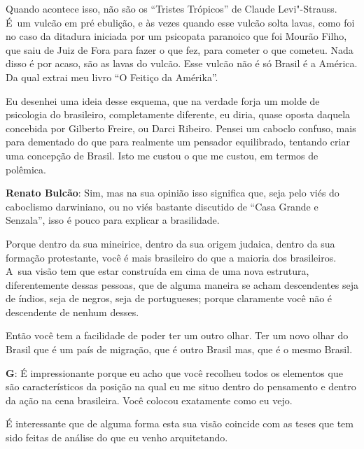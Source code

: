  

Quando acontece isso, não são os ``Tristes Trópicos'' de Claude
Levi"-Strauss. É~um vulcão em pré ebulição, e às vezes quando esse vulcão
solta lavas, como foi no caso da ditadura iniciada por um psicopata
paranoico que foi Mourão Filho, que saiu de Juiz de Fora para fazer o
que fez, para cometer o que cometeu. Nada disso é por acaso, são as
lavas do vulcão. Esse vulcão não é só Brasil é a América. Da qual extrai
meu livro ``O Feitiço da Amérika''.

 

Eu desenhei uma ideia desse esquema, que na verdade forja um molde de
psicologia do brasileiro, completamente diferente, eu diria, quase
oposta daquela concebida por Gilberto Freire, ou Darci Ribeiro. Pensei
um caboclo confuso, mais para dementado do que para realmente um
pensador equilibrado, tentando criar uma concepção de Brasil. Isto me
custou o que me custou, em termos de polêmica.

 

\textbf{Renato Bulcão}: Sim, mas na sua opinião isso significa que, seja
pelo viés do caboclismo darwiniano, ou no viés bastante discutido de
``Casa Grande e Senzala'', isso é pouco para explicar a brasilidade.

 

Porque dentro da sua mineirice, dentro da sua origem judaica, dentro da
sua formação protestante, você é mais brasileiro do que a maioria dos
brasileiros. A~sua visão tem que estar construída em cima de uma nova
estrutura, diferentemente dessas pessoas, que de alguma maneira se acham
descendentes seja de índios, seja de negros, seja de portugueses; porque
claramente você não é descendente de nenhum desses.

 

Então você tem a facilidade de poder ter um outro olhar. Ter um novo
olhar do Brasil que é um país de migração, que é outro Brasil mas, que é
o mesmo Brasil.

 

\textbf{G}: É impressionante porque eu acho que você recolheu todos os
elementos que são característicos da posição na qual eu me situo dentro
do pensamento e dentro da ação na cena brasileira. Você colocou
exatamente como eu vejo.

 

É interessante que de alguma forma esta sua visão coincide com as teses
que tem sido feitas de análise do que eu venho arquitetando.

 

